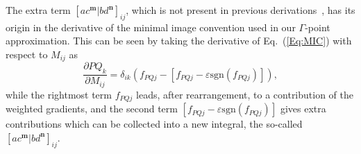\documentclass[prl,twocolumn,showpacs,twocolumngrid,superbib]{revtex4}
\begin{document}
The extra term $[ac^\mathbf{m}|bd^\mathbf{n}]_{ij}$, which is not present in 
previous derivations~\cite{MTobita03,KKudin00B,KDoll04}, 
has its origin in the derivative of the minimal image convention used in 
our $\Gamma$-point approximation. 
This can be seen by taking the derivative of Eq.~(\ref{Eq:MIC}) with respect to $M_{ij}$ as
\begin{equation*}
  \frac{\partial PQ_k}{\partial M_{ij}}=\delta_{ik}(f_{PQj}-[f_{PQj}-\varepsilon\mathrm{sgn}(f_{PQj})]),
\end{equation*}
while the rightmost term $f_{PQj}$ leads, after rearrangement, 
to a contribution of the weighted gradients, 
and the second term $[f_{PQj}-\varepsilon \mathrm{sgn}(f_{PQj})]$
gives extra contributions which can be collected into a new integral, the so-called
$[ac^\mathbf{m}|bd^\mathbf{n}]_{ij}$.

\end{document}
